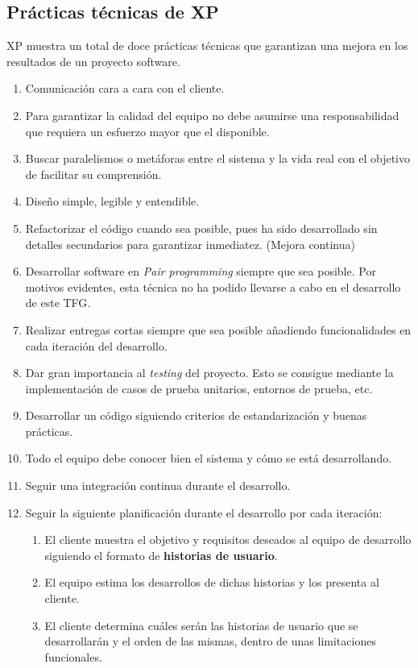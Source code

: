 \subsection{Prácticas técnicas de XP}
\gls{XP} muestra un total de doce prácticas técnicas que garantizan una mejora en los resultados de un proyecto software.~\cite{BaEu11}
\begin{enumerate}
\item Comunicación cara a cara con el cliente.
\item Para garantizar la calidad del equipo no debe asumirse una responsabilidad que requiera un esfuerzo mayor que el disponible.
\item Buscar paralelismos o metáforas entre el sistema y la vida real con el objetivo de facilitar su comprensión.
\item Diseño simple, legible y entendible.
\item Refactorizar el código cuando sea posible, pues ha sido desarrollado sin detalles secundarios para garantizar inmediatez. (Mejora continua)
\item Desarrollar software en \textit{Pair programming} siempre que sea posible. Por motivos evidentes, esta técnica no ha podido llevarse a cabo en el desarrollo de este \gls{TFG}.
\item Realizar entregas cortas siempre que sea posible añadiendo funcionalidades en cada iteración del desarrollo.
\item Dar gran importancia al \textit{testing} del proyecto. Esto se consigue mediante la implementación de casos de prueba unitarios, entornos de prueba, etc.
\item Desarrollar un código siguiendo criterios de estandarización y buenas prácticas.
\item Todo el equipo debe conocer bien el sistema y cómo se está desarrollando.
\item Seguir una integración continua durante el desarrollo.
\item Seguir la siguiente planificación durante el desarrollo por cada iteración:
  \begin{enumerate}
  \item El cliente muestra el objetivo y requisitos deseados al equipo de desarrollo siguiendo el formato de \textbf{historias de usuario}.
  \item El equipo estima los desarrollos de dichas historias y los presenta al cliente.
  \item El cliente determina cuáles serán las historias de usuario que se desarrollarán y el orden de las mismas, dentro de unas limitaciones funcionales.
    \end{enumerate}
\end{enumerate}
